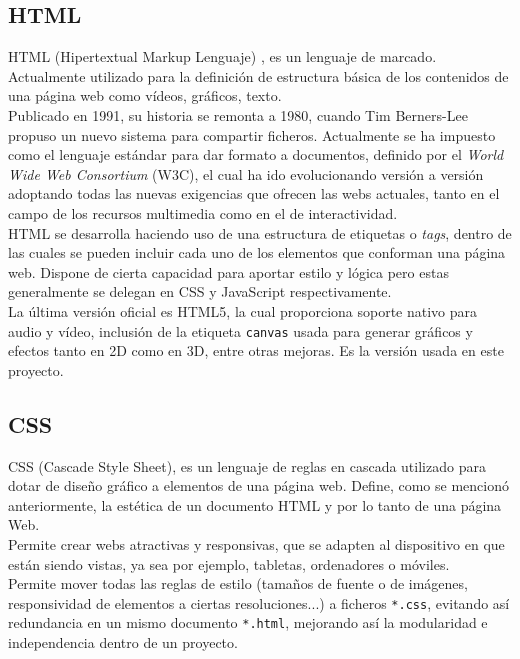 \documentclass[a4paper, 12pt]{book}
\begin{document}
	\subsection{HTML}
	\label{subsec:html}
		HTML (Hipertextual Markup Lenguaje) \cite{HTML}, es un lenguaje de marcado. Actualmente utilizado para la definición de  estructura básica de los contenidos de una página web como vídeos, gráficos, texto. \\
		
		Publicado en 1991, su historia se remonta a 1980, cuando Tim Berners-Lee propuso un nuevo sistema para compartir ficheros. Actualmente se ha impuesto como el lenguaje estándar para dar formato a documentos, definido por el \textit{World Wide Web Consortium} (W3C), el cual ha ido evolucionando versión a versión adoptando todas las nuevas exigencias que ofrecen las webs actuales, tanto en el campo de los recursos multimedia como en el de interactividad.\\
		
		HTML se desarrolla haciendo uso de una estructura de etiquetas o \textit{tags}, dentro de las cuales se pueden incluir cada uno de los elementos que conforman una página web. Dispone de cierta capacidad para aportar estilo y lógica pero estas generalmente se delegan en CSS y JavaScript respectivamente.\\
		
		La última versión oficial es HTML5, la cual proporciona soporte nativo para audio y vídeo, inclusión de la etiqueta \texttt{canvas} usada para generar gráficos y efectos tanto en 2D como en 3D, entre otras mejoras. Es la versión usada en este proyecto.
		
	\subsection{CSS}
	\label{subsec:css}
		CSS (Cascade Style Sheet), es un lenguaje de reglas en cascada utilizado para dotar de diseño gráfico a elementos de una página web. Define, como se mencionó anteriormente, la estética de un documento HTML y por lo tanto de una página Web. \\
		
		Permite crear webs atractivas y responsivas, que se adapten al dispositivo en que están siendo vistas, ya sea por ejemplo, tabletas, ordenadores o móviles.\\
		
		Permite mover todas las reglas de estilo (tamaños de fuente o de imágenes, responsividad de elementos a ciertas resoluciones...) a ficheros \texttt{*.css}, evitando así redundancia en un mismo documento \texttt{*.html}, mejorando así la modularidad e independencia dentro de un proyecto.\\
		
\end{document}
